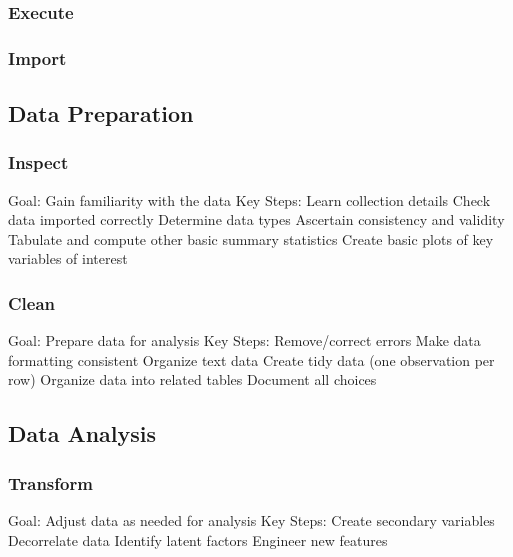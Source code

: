 \documentclass[
]{book}
\begin{document}
\hypertarget{execute}{%
\subsubsection{Execute}\label{execute}}

\hypertarget{import}{%
\subsubsection{Import}\label{import}}

\hypertarget{data-preparation}{%
\subsection{Data Preparation}\label{data-preparation}}

\hypertarget{inspect}{%
\subsubsection{Inspect}\label{inspect}}

Goal:
Gain familiarity with the data
Key Steps:
Learn collection details
Check data imported correctly
Determine data types
Ascertain consistency and validity
Tabulate and compute other basic summary statistics
Create basic plots of key variables of interest

\hypertarget{clean}{%
\subsubsection{Clean}\label{clean}}

Goal:
Prepare data for analysis
Key Steps:
Remove/correct errors
Make data formatting consistent
Organize text data
Create tidy data (one observation per row)
Organize data into related tables
Document all choices

\hypertarget{data-analysis}{%
\subsection{Data Analysis}\label{data-analysis}}

\hypertarget{transform}{%
\subsubsection{Transform}\label{transform}}

Goal:
Adjust data as needed for analysis
Key Steps:
Create secondary variables
Decorrelate data
Identify latent factors
Engineer new features
\end{document}
